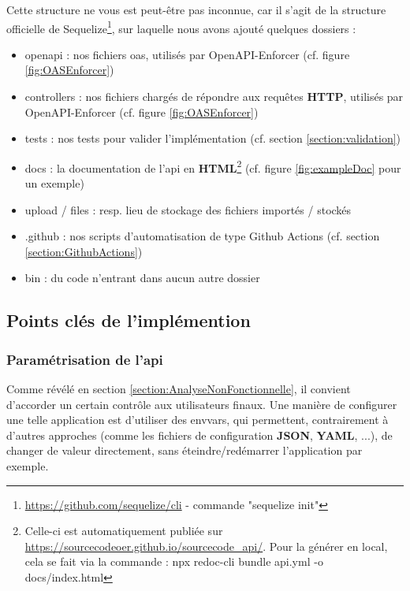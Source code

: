 Cette structure ne vous est peut-être pas inconnue, car il s'agit de la structure officielle de Sequelize\footnote{
    \url{https://github.com/sequelize/cli} - commande "sequelize init"
}, sur laquelle nous avons ajouté quelques dossiers :

\begin{itemize}
    \item openapi : nos fichiers \Gls{oas}, utilisés par OpenAPI-Enforcer (cf. figure \ref{fig:OASEnforcer})
    \item controllers : nos fichiers chargés de répondre aux requêtes \textbf{HTTP}, utilisés par OpenAPI-Enforcer (cf. figure \ref{fig:OASEnforcer})
    \item tests : nos tests pour valider l'implémentation (cf. section \ref{section:validation})
    \item docs : la documentation de l'\Gls{api} en \textbf{HTML}\footnote{
        Celle-ci est automatiquement publiée sur 
        \href{https://sourcecodeoer.github.io/sourcecode\_api/}{https://sourcecodeoer.github.io/sourcecode\_api/}.
        Pour la générer en local, cela se fait via la commande : 
        npx redoc-cli bundle api.yml -o docs/index.html 
    } (cf. figure \ref{fig:exampleDoc} pour un exemple)
    \item upload / files : resp. lieu de stockage des fichiers importés / stockés 
    \item .github : nos scripts d'automatisation de type Github Actions (cf. section \ref{section:GithubActions}) 
    \item bin : du code n'entrant dans aucun autre dossier
\end{itemize}

\pagebreak
\subsection{Points clés de l'implémention}

\subsubsection{Paramétrisation de l'\Gls{api}}

Comme révélé en section \ref{section:AnalyseNonFonctionnelle}, il convient d'accorder un certain contrôle aux utilisateurs finaux.
Une manière de configurer une telle application est d'utiliser des \glspl{envvar}, 
qui permettent, contrairement à d'autres approches (comme les fichiers de configuration \textbf{JSON}, \textbf{YAML}, ...), 
de changer de valeur directement, sans éteindre/redémarrer l'application par exemple. \\

